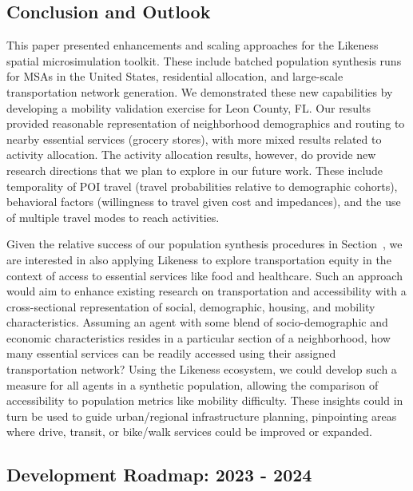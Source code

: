\subsection{Conclusion and Outlook}\label{section:conclusion-outlook}

This paper presented enhancements and scaling approaches for the Likeness spatial microsimulation toolkit. These include batched population synthesis runs for MSAs in the United States, residential allocation, and large-scale transportation network generation. We demonstrated these new capabilities by developing a mobility validation exercise for Leon County, FL. Our results provided reasonable representation of neighborhood demographics and routing to nearby essential services (grocery stores), with more mixed results related to activity allocation. The activity allocation results, however, do provide new research directions that we plan to explore in our future work. These include temporality of POI travel (travel probabilities relative to demographic cohorts), behavioral factors (willingness to travel given cost and impedances), and the use of multiple travel modes to reach activities.

Given the relative success of our population synthesis procedures in Section~, we are interested in also applying Likeness to explore transportation equity in the context of access to essential services like food and healthcare. Such an approach would aim to enhance existing research on transportation and accessibility \cite{horner_2015, wood_2016} with a cross-sectional representation of social, demographic, housing, and mobility characteristics. Assuming an agent with some blend of socio-demographic and economic characteristics resides in a particular section of a neighborhood, how many essential services can be readily accessed using their assigned transportation network? Using the Likeness ecosystem, we could develop such a measure for all agents in a synthetic population, allowing the comparison of accessibility to population metrics like mobility difficulty. These insights could in turn be used to guide urban/regional infrastructure planning, pinpointing areas where drive, transit, or bike/walk services could be improved or expanded.

\subsection{Development Roadmap: 2023 - 2024} \label{section:dev-roadmap}

